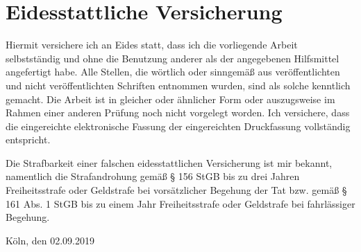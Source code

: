 \clearpage
\thispagestyle{empty}
\section*{Eidesstattliche Versicherung}
\label{sec:SOOA}

\vspace{2.5cm}


Hiermit versichere ich an Eides statt, dass ich die vorliegende Arbeit selbstständig und ohne die Benutzung anderer als der angegebenen Hilfsmittel angefertigt habe. Alle Stellen, die wörtlich oder sinngemäß aus veröffentlichten und nicht veröffentlichten Schriften entnommen wurden, sind als solche kenntlich gemacht. Die Arbeit ist in gleicher oder ähnlicher Form oder auszugsweise im Rahmen einer anderen Prüfung noch nicht vorgelegt worden. Ich versichere, dass die eingereichte elektronische Fassung der eingereichten Druckfassung vollständig entspricht.

\vspace{1cm}

\noindent
Die Strafbarkeit einer falschen eidesstattlichen Versicherung ist mir bekannt, namentlich die Strafandrohung gemäß § 156 StGB bis zu drei Jahren Freiheitsstrafe oder Geldstrafe bei vorsätzlicher Begehung der Tat bzw. gemäß § 161 Abs. 1 StGB bis zu einem Jahr Freiheitsstrafe oder Geldstrafe bei fahrlässiger Begehung.

\vspace{3cm}
\noindent
\textbf{\thesisauthor{}} 

\vspace{0.5cm}
\noindent
Köln, den 02.09.2019

